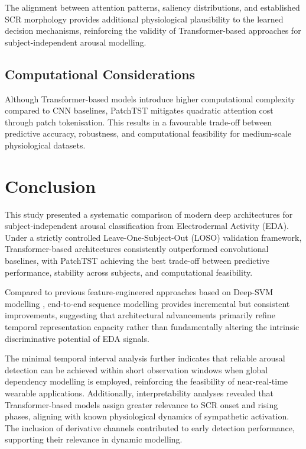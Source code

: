 \documentclass[runningheads]{llncs}
\begin{document}
The alignment between attention patterns, saliency distributions, and established SCR morphology provides additional physiological plausibility to the learned decision mechanisms, reinforcing the validity of Transformer-based approaches for subject-independent arousal modelling.

\subsection{Computational Considerations}

Although Transformer-based models introduce higher computational complexity compared to CNN baselines, PatchTST mitigates quadratic attention cost through patch tokenisation. This results in a favourable trade-off between predictive accuracy, robustness, and computational feasibility for medium-scale physiological datasets.


\section{Conclusion}

This study presented a systematic comparison of modern deep architectures for subject-independent arousal classification from Electrodermal Activity (EDA). Under a strictly controlled Leave-One-Subject-Out (LOSO) validation framework, Transformer-based architectures consistently outperformed convolutional baselines, with PatchTST achieving the best trade-off between predictive performance, stability across subjects, and computational feasibility.

Compared to previous feature-engineered approaches based on Deep-SVM modelling \cite{sanchez2020deep}, end-to-end sequence modelling provides incremental but consistent improvements, suggesting that architectural advancements primarily refine temporal representation capacity rather than fundamentally altering the intrinsic discriminative potential of EDA signals.

The minimal temporal interval analysis further indicates that reliable arousal detection can be achieved within short observation windows when global dependency modelling is employed, reinforcing the feasibility of near-real-time wearable applications. Additionally, interpretability analyses revealed that Transformer-based models assign greater relevance to SCR onset and rising phases, aligning with known physiological dynamics of sympathetic activation. The inclusion of derivative channels contributed to early detection performance, supporting their relevance in dynamic modelling.
\end{document}
